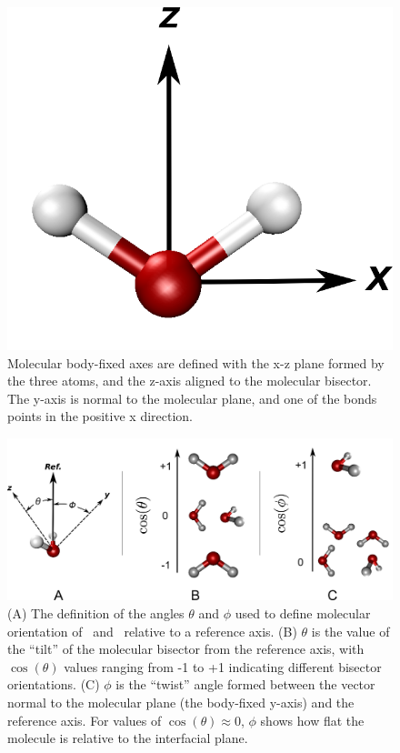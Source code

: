 \documentclass{article}
\begin{document}
\begin{figure}[h!]
	\begin{center}
		\includegraphics[scale=1.0]{images/molecularframesmall.png}
		\caption{Molecular body-fixed axes are defined with the x-z plane formed by the three atoms, and the z-axis aligned to the molecular bisector. The y-axis is normal to the molecular plane, and one of the bonds points in the positive x direction.}
		\label{fig:molecular-frame}
	\end{center}
\end{figure}

\begin{figure}[h!]
	\begin{center}
		\includegraphics[scale=1.0]{images/molecular-angles.png}
		\caption{(A) The definition of the angles $\theta$ and $\phi$ used to define molecular orientation of \suldiox~and \wat~relative to a reference axis. (B) $\theta$ is the value of the ``tilt'' of the molecular bisector from the reference axis, with $\cos(\theta)$ values ranging from -1 to +1 indicating different bisector orientations. (C) $\phi$ is the ``twist'' angle formed between the vector normal to the molecular plane (the body-fixed y-axis) and the reference axis. For values of $\cos(\theta) \approx 0$, $\phi$ shows how flat the molecule is relative to the interfacial plane.}
		\label{fig:water-angles}
	\end{center}
\end{figure}
\end{document}
